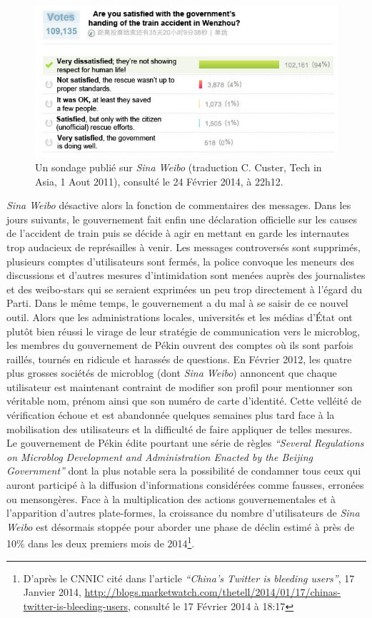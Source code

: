 \begin{figure}[htbp]
    \centering
    \includegraphics[scale=0.7]{figures/chap1/train.jpg}
    \caption[Sondage Weibo concernant l'accident de train de Wenzhou]{Un sondage publié sur \textit{Sina Weibo} (traduction C. Custer, Tech in Asia, 1 Aout 2011), consulté le 24 Février 2014, à 22h12.}
    \label{fig:poll_weibo}
\end{figure}

\textit{Sina Weibo} désactive alors la fonction de commentaires des messages. Dans les jours suivants, le gouvernement fait enfin une déclaration officielle sur les causes de l’accident de train puis se décide à agir en mettant en garde les internautes trop audacieux de représailles à venir. Les messages controversés sont supprimés, plusieurs comptes d'utilisateurs sont fermés, la police convoque les meneurs des discussions et d’autres mesures d’intimidation sont menées auprès des journalistes et des weibo-stars qui se seraient exprimées un peu trop directement à l’égard du Parti. Dans le même temps, le gouvernement a du mal à se saisir de ce nouvel outil. Alors que les administrations locales, universités et les médias d’État ont plutôt bien réussi le virage de leur stratégie de communication vers le microblog, les membres du gouvernement de Pékin ouvrent des comptes où ils sont parfois raillés, tournés en ridicule et harassés de questions. En Février 2012, les quatre plus grosses sociétés de microblog (dont \textit{Sina Weibo}) annoncent que chaque utilisateur est maintenant contraint de modifier son profil pour mentionner son véritable nom, prénom ainsi que son numéro de carte d’identité. Cette velléité de vérification échoue et est abandonnée quelques semaines plus tard face à la mobilisation des utilisateurs et la difficulté de faire appliquer de telles mesures. Le gouvernement de Pékin édite pourtant une série de règles \textit{“Several Regulations on Microblog Development and Administration Enacted by the Beijing Government”} dont la plus notable sera la possibilité de condamner tous ceux qui auront participé à la diffusion d’informations considérées comme fausses, erronées ou mensongères. Face à la multiplication des actions gouvernementales et à l’apparition d’autres plate-formes, la croissance du nombre d’utilisateurs de \textit{Sina Weibo} est désormais stoppée pour aborder une phase de déclin estimé à près de 10\% dans les deux premiers mois de 2014\footnote{D’après le CNNIC cité dans l’article  \textit{“China’s Twitter is bleeding users”}, 17 Janvier 2014, \url{http://blogs.marketwatch.com/thetell/2014/01/17/chinas-twitter-is-bleeding-users}, consulté le 17 Février 2014 à 18:17}. 

